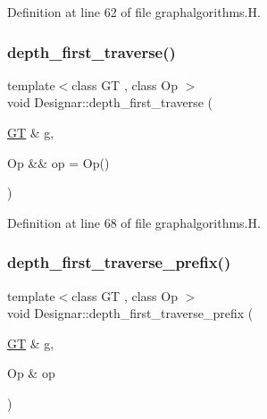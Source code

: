Definition at line 62 of file graphalgorithms.\+H.

\mbox{\label{namespace_designar_a40329a328d24d8ac25f540902fb69159}} 
\subsubsection{\texorpdfstring{depth\+\_\+first\+\_\+traverse()}{depth\_first\_traverse()}\hspace{0.1cm}{\footnotesize\ttfamily [2/2]}}
{\footnotesize\ttfamily template$<$class GT , class Op $>$ \\
void Designar\+::depth\+\_\+first\+\_\+traverse (\begin{DoxyParamCaption}\item[{\hyperlink{demo-buildgraph_8_c_a3001c40d2c31ca87ed96cd7d1334a55e}{GT} \&}]{g,  }\item[{Op \&\&}]{op = {\ttfamily Op()} }\end{DoxyParamCaption})}



Definition at line 68 of file graphalgorithms.\+H.

\mbox{\label{namespace_designar_a2c0d9c0ea5841058afe514c4451ab869}} 
\subsubsection{\texorpdfstring{depth\+\_\+first\+\_\+traverse\+\_\+prefix()}{depth\_first\_traverse\_prefix()}\hspace{0.1cm}{\footnotesize\ttfamily [1/2]}}
{\footnotesize\ttfamily template$<$class GT , class Op $>$ \\
void Designar\+::depth\+\_\+first\+\_\+traverse\+\_\+prefix (\begin{DoxyParamCaption}\item[{\hyperlink{demo-buildgraph_8_c_a3001c40d2c31ca87ed96cd7d1334a55e}{GT} \&}]{g,  }\item[{Op \&}]{op }\end{DoxyParamCaption})}



